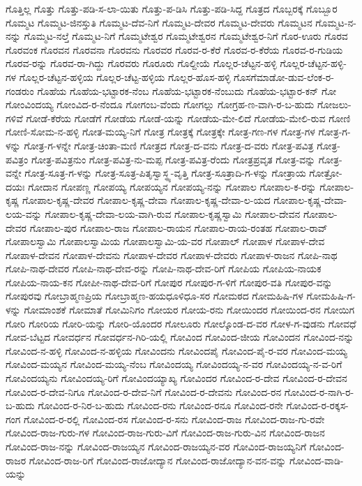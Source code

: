 ಗೊತ್ತಿಲ್ಲ
ಗೊತ್ತು
ಗೊತ್ತು-ಪಡಿ-ಸ-ಲಾ-ಯಿತು
ಗೊತ್ತು-ಪ-ಡಿಸಿ
ಗೊತ್ತು-ಪಡಿ-ಸಿದ್ದ
ಗೊತ್ರದ
ಗೊಬ್ಬರಕ್ಕೆ
ಗೊಬ್ಬೂರ
ಗೊಮ್ಮಟ
ಗೊಮ್ಮಟ-ಜಿನಸ್ತುತಿ
ಗೊಮ್ಮಟ-ದೆವ-ನಿಗೆ
ಗೊಮ್ಮಟ-ದೇವರ
ಗೊಮ್ಮಟ-ದೇವರು
ಗೊಮ್ಮಟನ
ಗೊಮ್ಮಟ-ನ-ನನ್ನು
ಗೊಮ್ಮಟ-ನಲ್ತೆ
ಗೊಮ್ಮಟ-ನಿಗೆ
ಗೊಮ್ಮಟೇಶ್ವರ
ಗೊಮ್ಮಟೇಶ್ವರನ
ಗೊಮ್ಮಟೇಶ್ವರ-ನಿಗೆ
ಗೊರ-ಊರು
ಗೊರವ
ಗೊರವಂಕ
ಗೊರವನ
ಗೊರವನಾ
ಗೊರವನು
ಗೊರವರ
ಗೊರವ-ರ-ಕೆರೆ
ಗೊರವ-ರ-ಕೆರೆಯ
ಗೊರವ-ರ-ಗುಡಿಯ
ಗೊರವ-ರನ್ನು
ಗೊರವ-ರಾ-ಗಿದ್ದು
ಗೊರವರು
ಗೊರೂರು
ಗೊಲ್ದೀಯೆ
ಗೊಲ್ಲರ-ಚೆಟ್ಟನ-ಹಳ್ಳಿ
ಗೊಲ್ಲರ-ಚೆಟ್ಟನ-ಹಳ್ಳಿ-ಗಳ
ಗೊಲ್ಲರ-ಚೆಟ್ಟನ-ಹಳ್ಳಿಯ
ಗೊಲ್ಲರ-ಚೆಟ್ಟ-ಹಳ್ಳಿಯ
ಗೊಲ್ಲರ-ಹೊಸ-ಹಳ್ಳಿ
ಗೊಸಗೆಮಾಡೋ-ಡುವ-ಲೆಂಕ-ರ-ಗಂಡರುಂ
ಗೊಹೆಯ
ಗೊಹೆಯ-ಭಟ್ಟಾರಕ-ನೆಂಬ
ಗೊಹೆಯ-ಭಟ್ಟಾರಕ-ನೆಂಬುದು
ಗೊಹೆಯ-ಭಟ್ಟಾರ-ಕನ್
ಗೋ
ಗೋಂವಿಂದಯ್ಯ
ಗೋಂವಿದ-ರ-ನೆಂದೂ
ಗೋಗಂಬ-ವೆಂದು
ಗೋಗಲ್ಲು
ಗೋಗ್ರಹ-ಣ-ವಾಗಿ-ರ-ಬ-ಹುದು
ಗೋಜಲು-ಗಳಿವೆ
ಗೋಡೆ-ಕೆರೆಯ
ಗೋಡೆಗೆ
ಗೋಡೆಯ
ಗೋಡೆ-ಯನ್ನು
ಗೋಡೆಯ-ಮೇ-ಲಿದೆ
ಗೋಡೆಯ-ಮೇಲಿ-ರುವ
ಗೋಣಿ
ಗೋಣಿ-ಸೋಮ-ನ-ಹಳ್ಳಿ
ಗೋತ-ಮಯ್ಯ-ನಿಗೆ
ಗೋತ್ರ
ಗೋತ್ರಕ್ಕೆ
ಗೋತ್ರಕ್ಕೇ
ಗೋತ್ರ-ಗಣ-ಗಳ
ಗೋತ್ರ-ಗಳ
ಗೋತ್ರ-ಗ-ಳನ್ನು
ಗೋತ್ರ-ಗ-ಳನ್ನೇ
ಗೋತ್ರ-ಚಿಂತಾ-ಮಣಿ
ಗೋತ್ರದ
ಗೋತ್ರ-ದ-ವನು
ಗೋತ್ರ-ದ-ವರು
ಗೋತ್ರ-ಪವಿತ್ರ
ಗೋತ್ರ-ಪವಿತ್ರಂ
ಗೋತ್ರ-ಪವಿತ್ರನುಂ
ಗೋತ್ರ-ಪವಿತ್ರ-ನು-ಮಪ್ಪ
ಗೋತ್ರ-ಪವಿತ್ರ-ರೆಂದು
ಗೋತ್ರಪ್ರವೃತ
ಗೋತ್ರ-ವನ್ನು
ಗೋತ್ರ-ವನ್ನೇ
ಗೋತ್ರ-ಸೂತ್ರ-ಗ-ಳನ್ನು
ಗೋತ್ರ-ಸೂತ್ರ-ಪಿತೃಸ್ವಾಸ್ಥ್ಯ-ವೃತ್ತಿ
ಗೋತ್ರ-ಸೂತ್ರಾದಿ-ಗ-ಳನ್ನು
ಗೋತ್ರಾಯ
ಗೋತ್ರೋ-ದಯಃ
ಗೋದಾನ
ಗೋಪಣ್ಣ
ಗೋಪಯ್ಯ
ಗೋಪಯ್ಯನ
ಗೋಪಯ್ಯ-ನನ್ನು
ಗೋಪಾಲ
ಗೋಪಾಲ-ಕ-ರನ್ನು
ಗೋಪಾಲ-ಕೃಷ್ಣ
ಗೋಪಾಲ-ಕೃಷ್ಣ-ದೇವರ
ಗೋಪಾಲ-ಕೃಷ್ಣ-ದೇವಾ
ಗೋಪಾಲ-ಕೃಷ್ಣ-ದೇವಾ-ಲ-ಯದ
ಗೋಪಾಲ-ಕೃಷ್ಣ-ದೇವಾ-ಲಯ-ವನ್ನು
ಗೋಪಾಲ-ಕೃಷ್ಣ-ದೇವಾ-ಲಯ-ವಾಗಿ-ರುವ
ಗೋಪಾಲ-ಕೃಷ್ಣಸ್ವಾಮಿ
ಗೋಪಾಲ-ದೇವನ
ಗೋಪಾಲ-ದೇವರ
ಗೋಪಾಲ-ಪುರ
ಗೋಪಾಲ-ರಾಜ
ಗೋಪಾಲ-ರಾಯನ
ಗೋಪಾಲ-ರಾಯ-ರಂತಹ
ಗೋಪಾಲ-ರಾವ್
ಗೋಪಾಲಸ್ವಾಮಿ
ಗೋಪಾಲಸ್ವಾಮಿಯ
ಗೋಪಾಲಸ್ವಾಮಿ-ಯ-ವರ
ಗೋಪಾಲ್
ಗೋಪಾಳ
ಗೋಪಾಳ-ದೇವ
ಗೋಪಾಳ-ದೇವನ
ಗೋಪಾಳ-ದೇವನು
ಗೋಪಾಳ-ದೇವರ
ಗೋಪಾಳ-ದೇವರು
ಗೋಪಾಳ-ರಾಜನ
ಗೋಪಿ-ನಾಥ
ಗೋಪಿ-ನಾಥ-ದೇವರ
ಗೋಪಿ-ನಾಥ-ದೇವ-ರನ್ನು
ಗೋಪಿ-ನಾಥ-ದೇವ-ರಿಗೆ
ಗೋಪಿಯ
ಗೋಪಿಯ-ನಾಯಕ
ಗೋಪಿಯ-ನಾಯ-ಕನ
ಗೋಪೀ-ನಾಥ-ದೇವ-ರಿಗೆ
ಗೋಪುರ
ಗೋಪುರ-ಗ-ಳಿಗೆ
ಗೋಪುರ-ವತಿ
ಗೋಪುರ-ವನ್ನು
ಗೋಪುರವು
ಗೋಬ್ರಾಹ್ಮಣಪ್ರಿಯ
ಗೋಬ್ರಾಹ್ಮಣ-ಹಯಧೂಳಿಧೂ-ಸರ
ಗೋಮಠದ
ಗೋಮಹಿಷಿ-ಗಳ
ಗೋಮಹಿಷಿ-ಗ-ಳನ್ನು
ಗೋಮಾಂಶಕೆ
ಗೋಮಾತೆ
ಗೋಮಿನಿಗಂ
ಗೋಯರ
ಗೋಯ-ರನು
ಗೋಯಿಂದರ
ಗೋಯಿಂದ-ರನ
ಗೋಯಿಗ
ಗೋರಿ
ಗೋರಿಯ
ಗೋರಿ-ಯನ್ನು
ಗೋರಿ-ಯೊಂದರ
ಗೋಲೂರು
ಗೋಲ್ಕೊಂಡ-ದ-ವರ
ಗೋಳ-ಗ-ವುಡನು
ಗೋವಧೆ
ಗೋವ-ಬೆಟ್ಟದ
ಗೋವರ್ಧನ
ಗೋವರ್ಧನ-ಗಿರಿ-ಯಲ್ಲಿ
ಗೋವಿಂದ
ಗೋವಿಂದ-ಜೀಯ
ಗೋವಿಂದನ
ಗೋವಿಂದ-ನನ್ನು
ಗೋವಿಂದ-ನ-ಹಳ್ಳಿ
ಗೋವಿಂದ-ನ-ಹಳ್ಳಿಯ
ಗೋವಿಂದನು
ಗೋವಿಂದಪೈ
ಗೋವಿಂದ-ಪೈ-ರ-ವರ
ಗೋವಿಂದ-ಮಯ್ಯ
ಗೋವಿಂದ-ಮಯ್ಯನ
ಗೋವಿಂದ-ಮಯ್ಯ-ನೆಂಬ
ಗೋವಿಂದಯ್ಯ
ಗೋವಿಂದಯ್ಯ-ನ-ವರ
ಗೋವಿಂದಯ್ಯ-ನ-ವ-ರಿಗೆ
ಗೋವಿಂದಯ್ಯನು
ಗೋವಿಂದಯ್ಯ-ರಿಗೆ
ಗೋವಿಂದಯ್ಯಾಖ್ಯ
ಗೋವಿಂದರ
ಗೋವಿಂದ-ರ-ದೇವ
ಗೋವಿಂದ-ರ-ದೇವನ
ಗೋವಿಂದ-ರ-ದೇವ-ನಿಗೂ
ಗೋವಿಂದ-ರ-ದೇವ-ನಿಗೆ
ಗೋವಿಂದ-ರ-ದೇವನು
ಗೋವಿಂದ-ರನ
ಗೋವಿಂದ-ರ-ನಾಗಿ-ರ-ಬ-ಹುದು
ಗೋವಿಂದ-ರ-ನಿರ-ಬ-ಹುದು
ಗೋವಿಂದ-ರನು
ಗೋವಿಂದ-ರನೂ
ಗೋವಿಂದ-ರನೇ
ಗೋವಿಂದ-ರ-ರಕ್ಕಸ-ಗಂಗ
ಗೋವಿಂದ-ರ-ರಲ್ಲಿ
ಗೋವಿಂದ-ರಸ
ಗೋವಿಂದ-ರ-ಸನು
ಗೋವಿಂದ-ರಾಜ
ಗೋವಿಂದ-ರಾಜ-ಗು-ರವೇ
ಗೋವಿಂದ-ರಾಜ-ಗುರು-ಗಳ
ಗೋವಿಂದ-ರಾಜ-ಗುರು-ವಿಗೆ
ಗೋವಿಂದ-ರಾಜ-ಗುರು-ವಿನ
ಗೋವಿಂದ-ರಾಜನ
ಗೋವಿಂದ-ರಾಜ-ನನ್ನು
ಗೋವಿಂದ-ರಾಜಯ್ಯನ
ಗೋವಿಂದ-ರಾಜಯ್ಯನ-ವರ
ಗೋವಿಂದ-ರಾಜಯ್ಯನಿಗೆ
ಗೋವಿಂದ-ರಾಜರ
ಗೋವಿಂದ-ರಾಜ-ರಿಗೆ
ಗೋವಿಂದ-ರಾಜೋದ್ಯಾನ
ಗೋವಿಂದ-ರಾಜೋದ್ಯಾನ-ವನ-ವನ್ನು
ಗೋವಿಂದ-ವಾಡಿ-ಯನ್ನು
